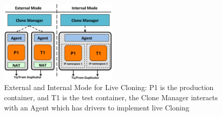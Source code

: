 \begin{figure}[t]
  \begin{center}
    \includegraphics[width=0.5\textwidth]{figs/modesCloning.eps}
    \caption{External and Internal Mode for Live Cloning: P1 is the production container, and T1 is the test container, the Clone Manager interacts with an Agent which has drivers to implement live Cloning}
    \label{fig:modesCloning}
  \end{center}
\end{figure}


